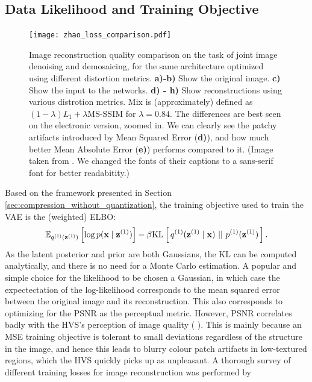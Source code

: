 \subsection{Data Likelihood and Training Objective}
\begin{figure}
  \centering
  \texttt{[image: zhao\_loss\_comparison.pdf]}
  \caption{Image reconstruction quality comparison on the task of joint
    image denoising and demosaicing, for the same architecture optimized using
    different distortion metrics. \textbf{a)-b)} Show the original image.
    \textbf{c)} Show the input to the networks. \textbf{d) - h)} Show
    reconstructions using various distrotion metrics. Mix is (approximately)
    defined as $(1 - \lambda) L_1 + \lambda \text{MS-SSIM}$ for $\lambda = 0.84$.
    The differences are best
    seen on the electronic version, zoomed in. We can clearly see the patchy
    artifacts introduced by Mean Squared Error (\textbf{d)}), and how much
    better Mean Absolute Error (\textbf{e)}) performs compared to it.
    (Image taken from \cite{zhao2015loss}. We changed the fonts of their
    captions to a sans-serif font for better readabitity.)}
  \label{fig:zhao_loss_comparison}
\end{figure}
\par
Based on the framework presented in Section
\ref{sec:compression_without_quantization}, the training objective used to train
the VAE is the (weighted) ELBO:
\begin{equation}
\label{eq:regular_vae_elbo}
\Exp{\log p(\vec{x} \mid \vec{z}^{(1)})}{q^{(1)}(\vec{z}^{(1)})}
- \beta \KL{q^{(1)}(\vec{z}^{(1)} \mid \vec{x})}{p^{(1)}(\vec{z}^{(1)})}.
\end{equation}
As the latent posterior and prior are both Gaussians, the KL can be computed
analytically, and there is no need for a Monte Carlo estimation. A popular and
simple choice for the likelihood to be chosen a Gaussian, in which case the
expectectation of the log-likelihood corresponds to the mean squared error
between the original image and its reconstruction. This also corresponds to
optimizing for the PSNR as the perceptual metric. However, PSNR correlates badly
with the HVS's perception of image quality (\cite{girod1993s}
\cite{eskicioglu1994image}). This is mainly because an MSE training objective is
tolerant to small deviations regardless of the structure in the image, and hence
this leads to blurry colour patch artifacts in low-textured regions, which the
HVS quickly picks up as unpleasant. A thorough survey of different
training losses for image reconstruction was performed by
